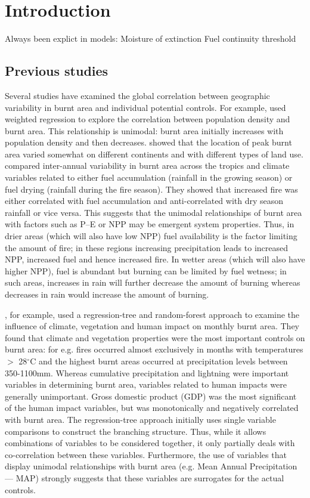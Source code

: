 \section{Introduction}

Always been explict in models:
	Moisture of extinction
	Fuel continuity threshold

\subsection{Previous studies}
Several studies have examined the global correlation between geographic variability in burnt area and individual potential controls. For example, \citet{bistinas2013relationships} used weighted regression to explore the correlation between population density and burnt area. This relationship is unimodal: burnt area initially increases with population density and then decreases. \citet{bistinas2013relationships} showed that the location of peak burnt area varied somewhat on different continents and with different types of land use. \citet{van2008climate} compared inter-annual variability in burnt area across the tropics and climate variables related to either fuel accumulation (rainfall in the growing season) or fuel drying (rainfall during the fire season). They showed that increased fire was either correlated with fuel accumulation and anti-correlated with dry season rainfall or vice versa. This suggests that the unimodal relationships of burnt area with factors such as P--E or NPP may be emergent system properties. Thus, in drier areas (which will also have low NPP) fuel availability is the factor limiting the amount of fire; in these regions increasing precipitation leads to increased NPP, increased fuel and hence increased fire. In wetter areas (which will also have higher NPP), fuel is abundant but burning can be limited by fuel wetness; in such areas, increases in rain will further decrease the amount of burning whereas decreases in rain would increase the amount of burning.

\citet{aldersley2011global}, for example, used a regression-tree and random-forest approach to examine the influence of climate, vegetation and human impact on monthly burnt area. They found that climate and vegetation properties were the most important controls on burnt area: for e.g. fires occurred almost exclusively in months with temperatures $>$ 28$^{\circ}$C and the highest burnt areas occurred at precipitation levels between 350-1100mm. Whereas cumulative precipitation and lightning were important variables in determining burnt area, variables related to human impacts were generally unimportant. Gross domestic product (GDP) was the most significant of the human impact variables, but was monotonically and negatively correlated with burnt area. The regression-tree approach initially uses single variable comparisons to construct the branching structure. Thus, while it allows combinations of variables to be considered together, it only partially deals with co-correlation between these variables. Furthermore, the use of variables that display unimodal relationships with burnt area (e.g. Mean Annual Precipitation --- MAP) strongly suggests that these variables are surrogates for the actual controls.

